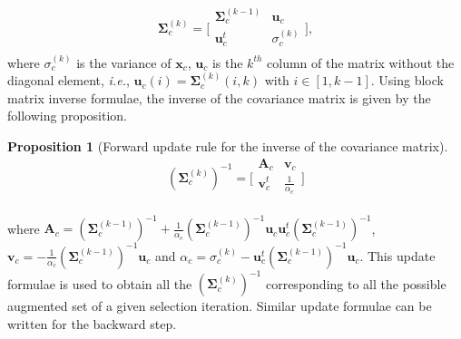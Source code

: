 \documentclass[journal]{IEEEtran}
\newtheorem{prop}{Proposition}
\begin{document}
        \begin{equation}\label{eq:cov}
            \boldsymbol{\Sigma}_c^{(k)} =
            \bigg[\begin{array}{cc}
            \boldsymbol{\Sigma}^{(k-1)}_c & \mathbf{u}_c      \\
            \mathbf{u}_c^t          & \sigma^{(k)}_c \\
            \end{array}\bigg],
        \end{equation}
        where  $\sigma^{(k)}_c$  is  the variance  of  $\mathbf{x}_c$,
        $\mathbf{u}_c$ is  the $k^{th}$  column of the  matrix without
        the          diagonal           element,          \emph{i.e.},
        $\mathbf{u}_{c}(i) =  \boldsymbol{\Sigma}^{(k)}_{c}(i,k)$ with
        $i  \in [1,k-1]$.   Using block  matrix inverse  formulae, the
        inverse of  the covariance  matrix is  given by  the following
        proposition.
        \begin{prop}[Forward update rule for the inverse of the covariance matrix]
        \label{eq:update-inv}
        \begin{equation}\label{eq:cov:inv}
                (\boldsymbol{\Sigma}_c^{(k)})^{-1} =
                \bigg[\begin{array}{cc}
                \mathbf{A}_c & \mathbf{v}_c \\
                \mathbf{v}_c^t  & \frac{1}{\alpha_c} \\
                \end{array}\bigg]
            \end{equation}
        \end{prop}
        \noindent                                                where
        $\mathbf{A}_c     =     (\boldsymbol{\Sigma}^{(k-1)}_c)^{-1}     +
        \frac{1}{\alpha_c} (\boldsymbol{\Sigma}^{(k-1)}_c)^{-1} \mathbf{u}_c
        \mathbf{u}_c^t              (\boldsymbol{\Sigma}^{(k-1)}_c)^{-1}$,
        $\mathbf{v}_c           =           -           \frac{1}{\alpha_c}
        (\boldsymbol{\Sigma}^{(k-1)}_c)^{-1}       \mathbf{u}_c$       and
        $      \alpha_c      =      \sigma^{(k)}_c      -      \mathbf{u}_c^t
        (\boldsymbol{\Sigma}^{(k-1)}_c)^{-1}  \mathbf{u}_c$.  This  update
        formulae      is     used      to      obtain     all      the
        $(\boldsymbol{\Sigma}^{(k)}_c)^{-1}$  corresponding  to all  the
        possible augmented set of a given selection iteration. Similar
        update formulae can be written for the backward step.
\end{document}
